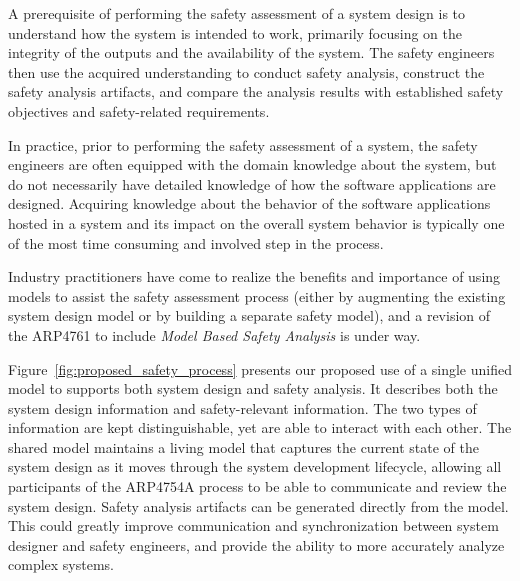 A prerequisite of performing the safety assessment of a system design is to understand how the system is intended to work, primarily focusing on the integrity of the outputs and the availability of the system. The safety engineers then use the acquired understanding to conduct safety analysis, construct the safety analysis artifacts, and compare the analysis results with established safety objectives and safety-related requirements. 

In practice, prior to performing the safety assessment of a system, the safety engineers are often equipped with the domain knowledge about the system, but do not necessarily have detailed knowledge of how the software applications are designed. Acquiring knowledge about the behavior of the software applications hosted in a system and its impact on the overall system behavior is typically one of the most time consuming and involved step in the process. 

Industry practitioners have come to realize the benefits and importance of
using models to assist the safety assessment process (either by augmenting the existing system design model or by building a separate safety model), and a revision of the ARP4761 to include {\em Model Based Safety Analysis} is under way.

Figure~\ref{fig:proposed_safety_process} presents our proposed use of a single unified model to supports both system design and safety analysis. It describes both the system design information and safety-relevant information. The two types of information are kept distinguishable, yet are able to interact with each other. The shared model maintains a living model that captures the current state of the system design as it moves through the system development lifecycle, allowing all participants of the ARP4754A process to be able to communicate and review the system design. Safety analysis artifacts can be generated directly from the model. This could greatly improve communication and synchronization between system designer and safety engineers, and provide the ability to more accurately analyze complex systems. 

